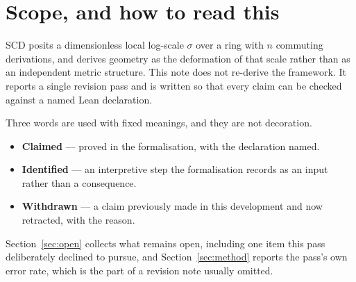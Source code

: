 \documentclass[11pt,a4paper]{article}
\theoremstyle{definition}
\theoremstyle{remark}
\newcommand{\lean}[1]{\texttt{\small #1}}
\newcommand{\Ric}{\mathrm{Ric}}
\newcommand{\sg}{\sigma}
\begin{document}
\begin{abstract}
\emph{Quantum.} Off the commuting locus the Ricci tensor is \emph{not symmetric},
with $\Ric_{be}-\Ric_{eb}=(n-2)[\sg_b,\sg_e]$, while the connection remains
torsion-free and the scalar curvature does not move at all. Nothing classical
takes a quantum correction at any order; in particular there is no $\hbar G/r^{3}$
correction to the Newtonian potential and no running of $G$. Finally the usual
four-constants--three-dimensions bookkeeping collapses to one grading in which
$\hbar$ and $G$ carry the \emph{same} weight, making ``are they the same
magnitude?'' a well-formed question whose answer is one pure number.

Five claims of the development are withdrawn, and three are kept while their
stated grounds are replaced. All statements are theorems in a Lean~4 development
of 1275 theorems, every one of which passes \lean{\#print axioms} with no axiom
beyond \lean{propext}, \lean{Classical.choice} and \lean{Quot.sound}, and no
\lean{sorry}.
\end{abstract}

\tableofcontents

\section{Scope, and how to read this}

SCD posits a dimensionless local log-scale $\sg$ over a ring with $n$ commuting
derivations, and derives geometry as the deformation of that scale rather than as
an independent metric structure. This note does not re-derive the framework. It
reports a single revision pass and is written so that every claim can be checked
against a named Lean declaration.

Three words are used with fixed meanings, and they are not decoration.

\begin{itemize}[leftmargin=1.4em]
\item \textbf{Claimed} --- proved in the formalisation, with the declaration named.
\item \textbf{Identified} --- an interpretive step the formalisation records as an
      input rather than a consequence.
\item \textbf{Withdrawn} --- a claim previously made in this development and now
      retracted, with the reason.
\end{itemize}

Section~\ref{sec:open} collects what remains open, including one item this pass
deliberately declined to pursue, and Section~\ref{sec:method} reports the pass's
own error rate, which is the part of a revision note usually omitted.
\end{document}

